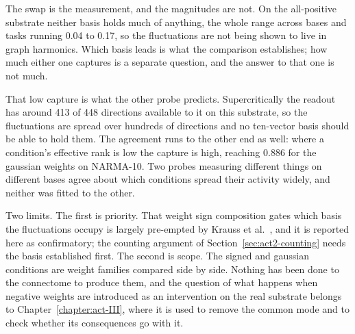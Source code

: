 The swap is the measurement, and the magnitudes are not. On the all-positive
substrate neither basis holds much of anything, the whole range across bases and
tasks running
0.04 to 0.17, %
so the fluctuations are not being shown to live in graph harmonics. Which basis
leads is what the comparison establishes; how much either one captures is a
separate question, and the answer to that one is not much.

That low capture is what the other probe predicts. Supercritically the readout
has around 413 %
of 448 directions available to it on this substrate, so the fluctuations are
spread over hundreds of directions and no ten-vector basis should be able to
hold them. The agreement runs to the other end as well: where a condition's
effective rank is low the capture is high, reaching
0.886 %
for the gaussian weights on NARMA-10. Two probes measuring different things on
different bases agree about which conditions spread their activity widely, and
neither was fitted to the other.

Two limits. The first is priority. That weight sign composition gates which
basis the fluctuations occupy is largely pre-empted by Krauss et
al.~\cite{krauss2019weight}, and it is reported here as confirmatory; the
counting argument of Section~\ref{sec:act2-counting} needs the basis established
first. The second is scope. The signed and gaussian conditions
are weight families compared side by side. Nothing has been done to the
connectome to produce them, and the question of what happens when negative
weights are introduced as an intervention on the real substrate belongs to
Chapter~\ref{chapter:act-III}, where it is used to remove the common mode and to
check whether its consequences go with it.

